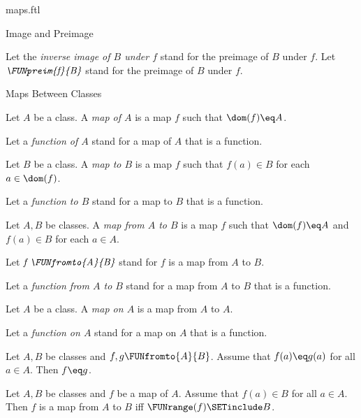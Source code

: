 \documentclass{naproche-library}
\begin{document}
\begin{smodule}[title=Maps]{maps.ftl}
\begin{sfragment}{Image and Preimage}
\begin{definition}[forthel,id=FOUNDATIONS_06_4563167805964288]
    Let the \emph{inverse image of $B$ under $f$} stand for the preimage of $B$ under $f$.
    Let $\emph{\FUNpreim{f}{B}}$ stand for the preimage of $B$ under $f$.
  \end{definition}
\end{sfragment}

\begin{sfragment}{Maps Between Classes}
  \begin{definition}[forthel,id=FOUNDATIONS_06_6934038600220672]
    Let $A$ be a class.
    A \emph{map of $A$} is a map $f$ such that $\dom(f) \eq A$.

    Let a \emph{function of $A$} stand for a map of $A$ that is a function.
  \end{definition}

  \begin{definition}[forthel,id=FOUNDATIONS_06_7725375157174272]
    Let $B$ be a class.
    A \emph{map to $B$} is a map $f$ such that $f(a) \in B$ for each $a \in \dom(f)$.

    Let a \emph{function to $B$} stand for a map to $B$ that is a function.
  \end{definition}

  \begin{definition}[forthel,id=FOUNDATIONS_06_2823507398361088]
    Let $A, B$ be classes.
    A \emph{map from $A$ to $B$} is a map $f$ such that $\dom(f) \eq A$ and $f(a) \in B$ for each $a \in A$.

    Let $\emph{f \FUNfromto{A}{B}}$ stand for $f$ is a map from $A$ to $B$.

    Let a \emph{function from $A$ to $B$} stand for a map from $A$ to $B$ that is a function.
  \end{definition}

  \begin{definition}[forthel,id=FOUNDATIONS_06_3390734908522496]
    Let $A$ be a class.
    A \emph{map on $A$} is a map from $A$ to $A$.

    Let a \emph{function on $A$} stand for a map on $A$ that is a function.
  \end{definition}

  \begin{proposition}[forthel,id=FOUNDATIONS_06_3312973569327104]
    Let $A, B$ be classes and $f, g \FUNfromto{A}{B}$.
    Assume that $f(a) \eq g(a)$ for all $a \in A$.
    Then $f \eq g$.
  \end{proposition}

  \begin{proposition}
    Let $A, B$ be classes and $f$ be a map of $A$.
    Assume that $f(a) \in B$ for all $a \in A$.
    Then $f$ is a map from $A$ to $B$ iff $\FUNrange(f) \SETinclude B$.
  \end{proposition}


\end{sfragment}
\end{smodule}
\end{document}
